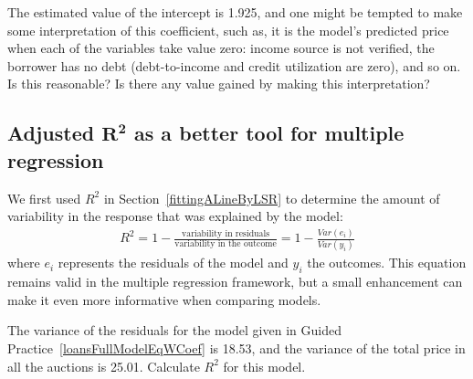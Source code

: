 \begin{exercisewrap}
\begin{nexercise}
The estimated value of the intercept is 1.925, and one might
be tempted to make some interpretation of this coefficient,
such as, it is the model's predicted price when each of the
variables take value zero: income source is not verified,
the borrower has no debt (debt-to-income and credit
utilization are zero), and so on.
Is this reasonable?
Is there any value gained by making this
interpretation?\footnotemark
\end{nexercise}
\end{exercisewrap}


\D{\newpage}

\subsection[Adjusted $R^2$ as a better tool
    for multiple regression]
    {Adjusted $\pmb{R^2}$ as a better tool
        for multiple regression}


We first used $R^2$ in Section~\ref{fittingALineByLSR}
to determine the amount of variability in the response
that was explained by the model:
\begin{align*}
R^2 =
    1 - \frac{\text{variability in residuals}}
        {\text{variability in the outcome}}
	= 1 - \frac{Var(e_i)}{Var(y_i)}
\end{align*}
where $e_i$ represents the residuals of the model and
$y_i$ the outcomes.
This equation remains valid in the multiple regression
framework, but a small enhancement can make it even
more informative when comparing models.

\begin{exercisewrap}
\begin{nexercise}
\label{computeUnadjR2ForFullLoansModel}%
The variance of the residuals for the model given in
Guided Practice~\ref{loansFullModelEqWCoef}
is 18.53, and the variance of the total price in all
the auctions is 25.01.
Calculate $R^2$ for this model.\footnotemark
\end{nexercise}
\end{exercisewrap}

